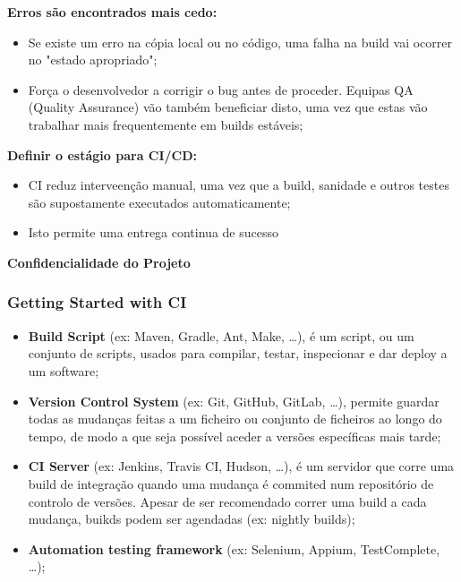 \documentclass{article}
\begin{document}
\begin{flushleft}
  \textbf{Erros são encontrados mais cedo:}
  \begin{itemize}
    \item Se existe um erro na cópia local ou no código,
    uma falha na build vai ocorrer no "estado apropriado";
    \item Força o desenvolvedor a corrigir o bug antes de
    proceder. Equipas QA (Quality Assurance) vão também beneficiar
    disto, uma vez que estas vão trabalhar mais frequentemente em builds estáveis;
  \end{itemize}

  \textbf{Definir o estágio para CI/CD:}
  \begin{itemize}
    \item CI reduz interveenção manual, uma vez que a build,
    sanidade e outros testes são supostamente executados automaticamente;
    \item Isto permite uma entrega continua de sucesso
  \end{itemize}

  \textbf{Confidencialidade do Projeto}
\end{flushleft}

\subsubsection{Getting Started with CI}

\begin{itemize}
  \item \textbf{Build Script} (ex: Maven, Gradle, Ant, Make, \dots),
  é um script, ou um conjunto de scripts, usados para compilar, testar,
  inspecionar e dar deploy a um software;

  \item \textbf{Version Control System} (ex: Git, GitHub, GitLab, \dots),
  permite guardar todas as mudanças feitas a um ficheiro ou conjunto
  de ficheiros ao longo do tempo, de modo a que seja possível
  aceder a versões específicas mais tarde;

  \item \textbf{CI Server} (ex: Jenkins, Travis CI, Hudson, \dots),
  é um servidor que corre uma build de integração quando uma mudança
  é commited num repositório de controlo de versões. Apesar de ser recomendado
  correr uma build a cada mudança, buikds podem ser agendadas
  (ex: nightly builds);

  \item \textbf{Automation testing framework} (ex: Selenium, Appium,
  TestComplete, \dots);
\end{itemize}
\end{document}
